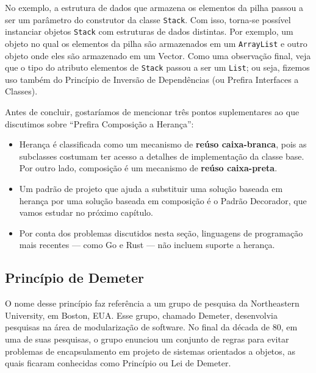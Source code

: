 \documentclass[
  11pt,
  twoside]{book}
\newcommand{\passthrough}[1]{#1}
\begin{document}
No exemplo, a estrutura de dados que armazena os elementos da pilha
passou a ser um parâmetro do construtor da classe
\passthrough{\lstinline!Stack!}. Com isso, torna-se possível instanciar
objetos \passthrough{\lstinline!Stack!} com estruturas de dados
distintas. Por exemplo, um objeto no qual os elementos da pilha são
armazenados em um \passthrough{\lstinline!ArrayList!} e outro objeto
onde eles são armazenado em um Vector. Como uma observação final, veja
que o tipo do atributo elementos de \passthrough{\lstinline!Stack!}
passou a ser um \passthrough{\lstinline!List!}; ou seja, fizemos uso
também do Princípio de Inversão de Dependências (ou Prefira Interfaces a
Classes).

Antes de concluir, gostaríamos de mencionar três pontos suplementares ao
que discutimos sobre ``Prefira Composição a Herança'':

\begin{itemize}
\item
  Herança é classificada como um mecanismo de \textbf{reúso
  caixa-branca}, pois as subclasses costumam ter acesso a detalhes de
  implementação da classe base. 
   Por outro lado, composição é um mecanismo
  de \textbf{reúso caixa-preta}.
\item
  Um padrão de projeto que ajuda a substituir uma solução baseada em
  herança por uma solução baseada em composição é o Padrão Decorador,
  que vamos estudar no próximo capítulo.
\item
  Por conta dos problemas discutidos nesta seção, 
   linguagens de programação mais recentes --- como Go e
  Rust --- não incluem suporte a herança.
\end{itemize}

\hypertarget{princuxedpio-de-demeter}{%
\subsection{Princípio de Demeter}\label{princuxedpio-de-demeter}}

 

O nome desse princípio faz referência a um grupo de pesquisa da
Northeastern University, em Boston, EUA. Esse grupo, chamado Demeter,
desenvolvia pesquisas na área de modularização de software. No final da
década de 80, em uma de suas pesquisas, o grupo enunciou um conjunto de
regras para evitar problemas de encapsulamento em projeto de sistemas
orientados a objetos, as quais ficaram conhecidas como Princípio ou Lei
de Demeter.
\end{document}
